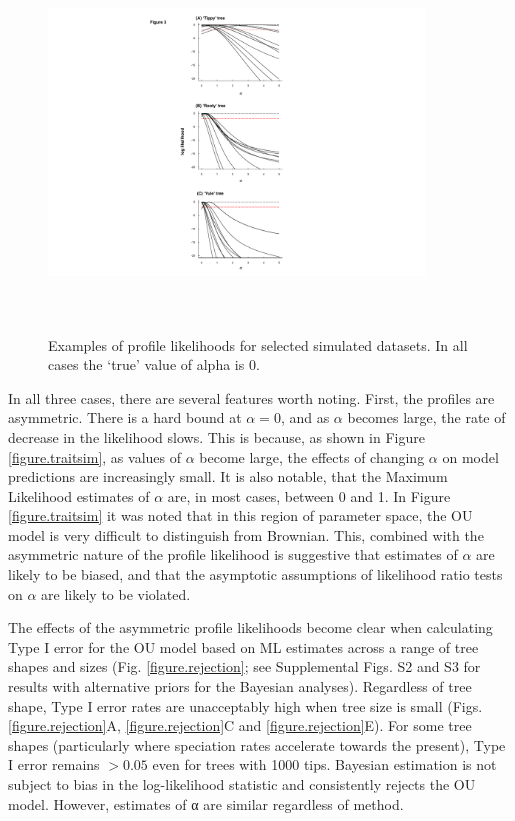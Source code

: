 \documentclass[a4paper,12pt]{article}
\begin{document}
\begin{figure}
  \centering
  \includegraphics[width=10cm, height=10cm, keepaspectratio=true]{Figures/OU_figure3.pdf}
  \caption{Examples of profile likelihoods for selected simulated datasets. In all cases the ‘true’ value of alpha is 0.}
\label{figure.profiles}
\end{figure}

In all three cases, there are several features worth noting. First, the profiles are asymmetric. There is a hard bound at $\alpha = 0$, and as $\alpha$ becomes large, the rate of decrease in the likelihood slows. This is because, as shown in Figure \ref{figure.traitsim}, as values of $\alpha$ become large, the effects of changing $\alpha$ on model predictions are increasingly small. It is also notable, that the Maximum Likelihood estimates of $\alpha$ are, in most cases, between 0 and 1. In Figure \ref{figure.traitsim} it was noted that in this region of parameter space, the OU model is very difficult to distinguish from Brownian. This, combined with the asymmetric nature of the profile likelihood is suggestive that estimates of $\alpha$ are likely to be biased, and that the asymptotic assumptions of likelihood ratio tests on $\alpha$ are likely to be violated.

The effects of the asymmetric profile likelihoods become clear when calculating Type I error for the OU model based on ML estimates across a range of tree shapes and sizes (Fig. \ref{figure.rejection}; see Supplemental Figs. S2 and S3 for results with alternative priors for the Bayesian analyses). Regardless of tree shape, Type I error rates are unacceptably high when tree size is small (Figs. \ref{figure.rejection}A, \ref{figure.rejection}C and \ref{figure.rejection}E). For some tree shapes (particularly where speciation rates accelerate towards the present), Type I error remains $>0.05$ even for trees with 1000 tips. Bayesian estimation is not subject to bias in the log-likelihood statistic and consistently rejects the OU model. However, estimates of α are similar regardless of method.
\end{document}
